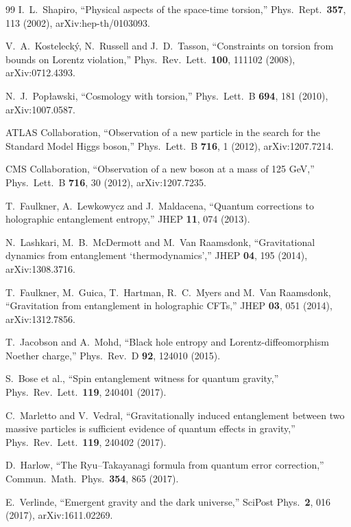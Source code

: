 \documentclass[11pt]{article}
\theoremstyle{definition}
\begin{document}
\begin{thebibliography}{99}
I.~L.~Shapiro, ``Physical aspects of the space-time torsion,''
Phys.\ Rept.\ \textbf{357}, 113 (2002), arXiv:hep-th/0103093.

V.~A.~Kosteleck\'y, N.~Russell and J.~D.~Tasson, ``Constraints on torsion
from bounds on Lorentz violation,''
Phys.\ Rev.\ Lett.\ \textbf{100}, 111102 (2008), arXiv:0712.4393.

N.~J.~Pop\l awski, ``Cosmology with torsion,''
Phys.\ Lett.\ B \textbf{694}, 181 (2010), arXiv:1007.0587.

ATLAS Collaboration, ``Observation of a new particle in the search for
the Standard Model Higgs boson,''
Phys.\ Lett.\ B \textbf{716}, 1 (2012), arXiv:1207.7214.

CMS Collaboration, ``Observation of a new boson at a mass of 125 GeV,''
Phys.\ Lett.\ B \textbf{716}, 30 (2012), arXiv:1207.7235.

T.~Faulkner, A.~Lewkowycz and J.~Maldacena, ``Quantum corrections to
holographic entanglement entropy,'' JHEP \textbf{11}, 074 (2013).

N.~Lashkari, M.~B.~McDermott and M.~Van Raamsdonk, ``Gravitational
dynamics from entanglement `thermodynamics','' JHEP \textbf{04}, 195
(2014), arXiv:1308.3716.

T.~Faulkner, M.~Guica, T.~Hartman, R.~C.~Myers and M.~Van Raamsdonk,
``Gravitation from entanglement in holographic CFTs,''
JHEP \textbf{03}, 051 (2014), arXiv:1312.7856.

T.~Jacobson and A.~Mohd, ``Black hole entropy and Lorentz-diffeomorphism
Noether charge,'' Phys.\ Rev.\ D \textbf{92}, 124010 (2015).

S.~Bose et al., ``Spin entanglement witness for quantum gravity,''
Phys.\ Rev.\ Lett.\ \textbf{119}, 240401 (2017).

C.~Marletto and V.~Vedral, ``Gravitationally induced entanglement between
two massive particles is sufficient evidence of quantum effects in
gravity,'' Phys.\ Rev.\ Lett.\ \textbf{119}, 240402 (2017).

D.~Harlow, ``The Ryu--Takayanagi formula from quantum error correction,''
Commun.\ Math.\ Phys.\ \textbf{354}, 865 (2017).

E.~Verlinde, ``Emergent gravity and the dark universe,''
SciPost Phys.\ \textbf{2}, 016 (2017), arXiv:1611.02269.


\end{thebibliography}
\end{document}
